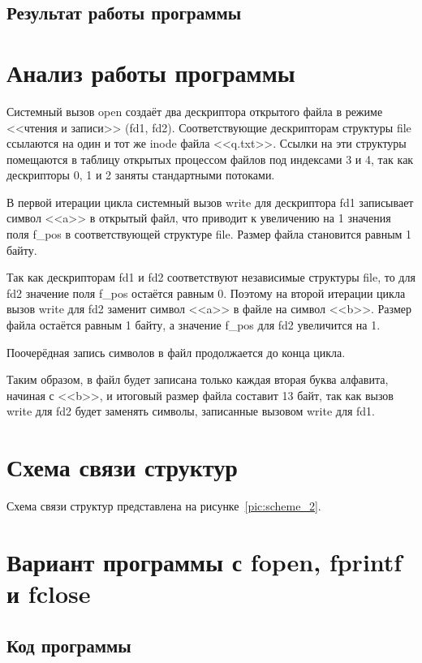 \subsection{Результат работы программы}


\section{Анализ работы программы}

Системный вызов open создаёт два дескриптора открытого файла в режиме <<чтения и записи>> (fd1, fd2). Соответствующие дескрипторам структуры file ссылаются на один и тот же inode файла <<q.txt>>. Ссылки на эти структуры помещаются в таблицу открытых процессом файлов под индексами 3 и 4, так как дескрипторы 0, 1 и 2 заняты стандартными потоками.

В первой итерации цикла системный вызов write для дескриптора fd1 записывает символ <<a>> в открытый файл, что приводит к увеличению на 1 значения поля f\_pos в соответствующей структуре file. Размер файла становится равным 1 байту.

Так как дескрипторам fd1 и fd2 соответствуют независимые структуры file, то для fd2 значение поля f\_pos остаётся равным 0. Поэтому на второй итерации цикла вызов write для fd2 заменит символ <<a>> в файле на символ <<b>>. Размер файла остаётся равным 1 байту, а значение f\_pos для fd2 увеличится на 1.

Поочерёдная запись символов в файл продолжается до конца цикла.

Таким образом, в файл будет записана только каждая вторая буква алфавита, начиная с <<b>>, и итоговый размер файла составит 13 байт, так как вызов write для fd2 будет заменять символы, записанные вызовом write для fd1.

\section{Схема связи структур}

Схема связи структур представлена на рисунке~\ref{pic:scheme_2}.

\section{Вариант программы с fopen, fprintf и fclose}

\subsection{Код программы}

